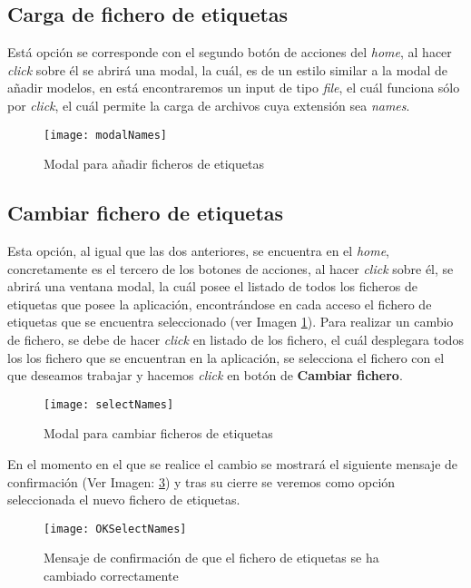 \subsection{Carga de fichero de etiquetas}
Está opción se corresponde con el segundo botón de acciones del \textit{home}, al hacer \textit{click} sobre él se abrirá una modal, la cuál, es de un estilo similar a la modal de añadir modelos, en está encontraremos un input de tipo \textit{file}, el cuál funciona sólo por \textit{click}, el cuál permite la carga de archivos cuya extensión sea \textit{names}.
\begin{figure}[!h]
    \centering
    \texttt{[image: modalNames]}
    \caption{Modal para añadir ficheros de etiquetas}\label{fig:modalNames}
\end{figure}

\subsection{Cambiar fichero de etiquetas} \label{Cambiar fichero de etiquetas}
Esta opción, al igual que las dos anteriores, se encuentra en el \textit{home}, concretamente es el tercero de los botones de acciones, al hacer \textit{click} sobre él, se abrirá una ventana modal, la cuál posee el listado de todos los ficheros de etiquetas que posee la aplicación, encontrándose en cada acceso el fichero de etiquetas que se encuentra seleccionado (ver Imagen \ref{fig:modalNames}).
Para realizar un cambio de fichero, se debe de hacer \textit{click} en listado de los fichero, el cuál desplegara todos los los fichero que se encuentran en la aplicación, se selecciona el fichero con el que deseamos trabajar y hacemos \textit{click} en botón de \textbf{Cambiar fichero}.

\begin{figure}[!h]
    \centering
    \texttt{[image: selectNames]}
    \caption{Modal para cambiar ficheros de etiquetas}\label{fig:selectNames}
\end{figure}

En el momento en el que se realice el cambio se mostrará el siguiente mensaje de confirmación (Ver Imagen: \ref{fig:OKSelectNames}) y tras su cierre se veremos como opción seleccionada el nuevo fichero de etiquetas.

\begin{figure}[!h]
    \centering
    \texttt{[image: OKSelectNames]}
    \caption{Mensaje de confirmación de que el fichero de etiquetas se ha cambiado correctamente}\label{fig:OKSelectNames}
\end{figure}

